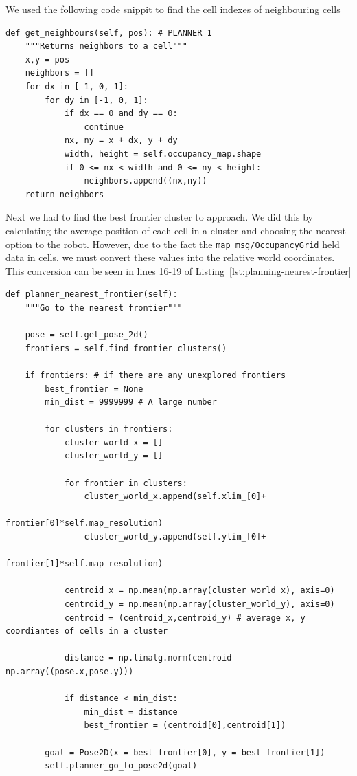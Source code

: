 \documentclass[a4paper,11pt]{article}
\begin{document}
\newpage

We used the following code snippit to find the cell indexes of neighbouring cells

\begin{lstlisting}[caption={Find neighbouring cell indexes}, label={lst:planning-find-neighbour}]
def get_neighbours(self, pos): # PLANNER 1
    """Returns neighbors to a cell"""
    x,y = pos
    neighbors = []
    for dx in [-1, 0, 1]:
        for dy in [-1, 0, 1]:
            if dx == 0 and dy == 0:
                continue
            nx, ny = x + dx, y + dy
            width, height = self.occupancy_map.shape
            if 0 <= nx < width and 0 <= ny < height:
                neighbors.append((nx,ny))
    return neighbors
\end{lstlisting}

Next we had to find the best frontier cluster to approach.
We did this by calculating the average position of each cell in a cluster and choosing the nearest option to the robot.
However, due to the fact the \texttt{map\_\allowbreak msg/OccupancyGrid} held data in cells, we must convert these values into the relative world coordinates.
This conversion can be seen in lines 16-19 of Listing~\ref{lst:planning-nearest-frontier}

\newpage

\begin{lstlisting}[caption={Approach the nearest frontier cluster}, label={lst:planning-nearest-frontier}]
def planner_nearest_frontier(self):
    """Go to the nearest frontier"""

    pose = self.get_pose_2d()
    frontiers = self.find_frontier_clusters()

    if frontiers: # if there are any unexplored frontiers
        best_frontier = None
        min_dist = 9999999 # A large number

        for clusters in frontiers:
            cluster_world_x = []
            cluster_world_y = []

            for frontier in clusters:
                cluster_world_x.append(self.xlim_[0]+
                                        frontier[0]*self.map_resolution)
                cluster_world_y.append(self.ylim_[0]+
                                        frontier[1]*self.map_resolution)

            centroid_x = np.mean(np.array(cluster_world_x), axis=0)
            centroid_y = np.mean(np.array(cluster_world_y), axis=0)
            centroid = (centroid_x,centroid_y) # average x, y coordiantes of cells in a cluster

            distance = np.linalg.norm(centroid-np.array((pose.x,pose.y)))

            if distance < min_dist:
                min_dist = distance
                best_frontier = (centroid[0],centroid[1])

        goal = Pose2D(x = best_frontier[0], y = best_frontier[1])
        self.planner_go_to_pose2d(goal)
\end{lstlisting}
\end{document}
